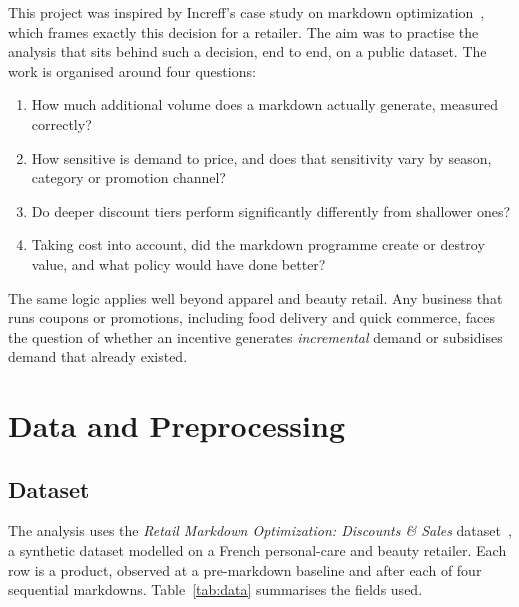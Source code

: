 \documentclass[11pt, a4paper]{article}
\begin{document}
This project was inspired by Increff's case study on markdown optimization~\cite{increff}, which frames exactly this decision for a retailer. The aim was to practise the analysis that sits behind such a decision, end to end, on a public dataset. The work is organised around four questions:
\begin{enumerate}[label=\textbf{Q\arabic*.}]
  \item How much additional volume does a markdown actually generate, measured correctly?
  \item How sensitive is demand to price, and does that sensitivity vary by season, category or promotion channel?
  \item Do deeper discount tiers perform significantly differently from shallower ones?
  \item Taking cost into account, did the markdown programme create or destroy value, and what policy would have done better?
\end{enumerate}
The same logic applies well beyond apparel and beauty retail. Any business that runs coupons or promotions, including food delivery and quick commerce, faces the question of whether an incentive generates \emph{incremental} demand or subsidises demand that already existed.

\section{Data and Preprocessing}
\subsection{Dataset}
The analysis uses the \textit{Retail Markdown Optimization: Discounts \& Sales} dataset~\cite{kaggle}, a synthetic dataset modelled on a French personal-care and beauty retailer. Each row is a product, observed at a pre-markdown baseline and after each of four sequential markdowns. Table~\ref{tab:data} summarises the fields used.
\end{document}
